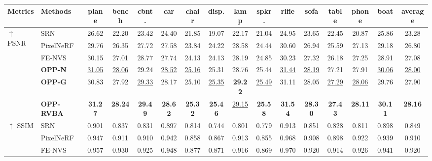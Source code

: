 
\begin{table}[t]
  
  \begin{adjustbox}{width=\linewidth,center}
      \begin{tabular}{l| l c c c c c c c c c c c c c c}
        \rowcolor[gray]{.9}
        \hline
        Metrics & Methods & plane & bench & cbnt. & car & chair & disp. & lamp & spkr. & rifle & sofa & table & phone & boat & average \\
         \hline \hline
        \multirow{6}{*}{$\uparrow$ PSNR}    & SRN       & 26.62 & 22.20 & 23.42 & 24.40 & 21.85 & 19.07 & 22.17 & 21.04 & 24.95 & 23.65 & 22.45 & 20.87 & 25.86 & 23.28 \\
                                           & PixelNeRF & 29.76 & 26.35 & 27.72 & 27.58 & 23.84 & 24.22 & 28.58 & 24.44 & 30.60 & 26.94 & 25.59 & 27.13 & 29.18 & 26.80\\
                                           & FE-NVS    & 30.15 & 27.01 & 28.77 & 27.74 & 24.13 & 24.13 & 28.19 & 24.85 & 30.23 & 27.32 & 26.18 & 27.25 & 28.91 & 27.08 \\ \cline{2-16}
                                         &\textbf{OPP-N}& \underline{31.05} & \underline{28.06} & {29.24} & \underline{28.52} & \underline{25.16} & {25.31} & {28.76} & {25.44} & \underline{31.44} & \underline{28.19} & {27.21} & {27.91} & \underline{30.06} & \underline{28.00} \\
                                         &\textbf{OPP-G}& {30.83} & {27.92} & \underline{29.33} & {28.17} & {25.10} & \underline{25.35} & \textbf{29.22} & \underline{25.49} & {31.11} & {28.05} & \underline{27.29} & \underline{28.06} & {29.76} & {27.90} \\
                                         &\textbf{OPP-RVBA}& \textbf{31.27} & \textbf{28.24} & \textbf{29.49} & \textbf{28.62} & \textbf{25.32} & \textbf{25.46} & \underline{29.15} & \textbf{25.58} & \textbf{31.54} & \textbf{28.30} & \textbf{27.43} & \textbf{28.11} & \textbf{30.11} & \textbf{28.16} \\
         \hline
        \multirow{6}{*}{$\uparrow$ SSIM}    & SRN       & 0.901 & 0.837 & 0.831 & 0.897 & 0.814 & 0.744 & 0.801 & 0.779 & 0.913 & 0.851 & 0.828 & 0.811 & 0.898 & 0.849 \\
                                           & PixelNeRF & 0.947 & 0.911 & 0.910 & 0.942 & 0.858 & 0.867 & 0.913 & 0.855 & 0.968 & 0.908 & 0.898 & 0.922 & 0.939 & 0.910 \\
                                           & FE-NVS    & 0.957 & 0.930 & 0.925 & 0.948 & 0.877 & 0.871 & 0.916 & 0.869 & 0.970 & 0.920 & 0.914 & 0.926 & 0.941 & 0.920 \\

\end{tabular}
\end{adjustbox}
\end{table}
